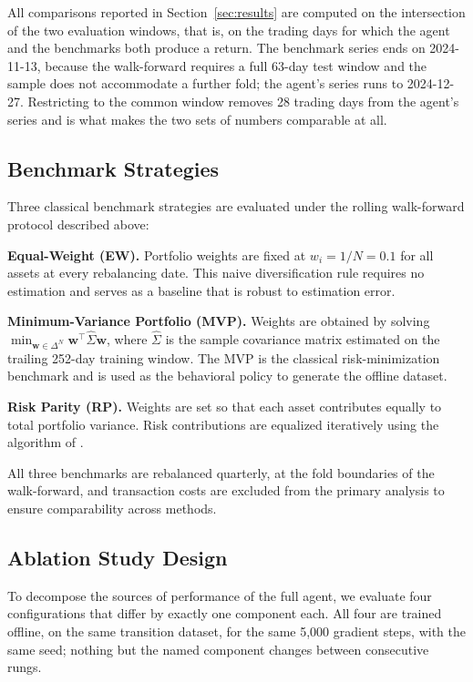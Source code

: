 All comparisons reported in Section~\ref{sec:results} are computed on the
intersection of the two evaluation windows, that is, on the trading days for
which the agent and the benchmarks both produce a return.
The benchmark series ends on 2024-11-13, because the walk-forward requires a full
63-day test window and the sample does not accommodate a further fold; the
agent's series runs to 2024-12-27.
Restricting to the common window removes 28 trading days from the agent's series
and is what makes the two sets of numbers comparable at all.

\subsection{Benchmark Strategies}
\label{subsec:benchmarks}

Three classical benchmark strategies are evaluated under the rolling
walk-forward protocol described above:

\textbf{Equal-Weight (EW).} Portfolio weights are fixed at $w_i = 1/N = 0.1$
for all assets at every rebalancing date.
This naive diversification rule \citep{DeMiguel2007} requires no estimation
and serves as a baseline that is robust to estimation error.

\textbf{Minimum-Variance Portfolio (MVP).} Weights are obtained by solving
$\min_{\mathbf{w} \in \Delta^N} \mathbf{w}^\top \hat{\Sigma} \mathbf{w}$,
where $\hat{\Sigma}$ is the sample covariance matrix estimated on the trailing
252-day training window.
The MVP is the classical risk-minimization benchmark and is used as the
behavioral policy to generate the offline dataset.

\textbf{Risk Parity (RP).} Weights are set so that each asset contributes equally
to total portfolio variance.
Risk contributions are equalized iteratively using the algorithm of
\citet{Maillard2010}.

All three benchmarks are rebalanced quarterly, at the fold boundaries of the
walk-forward, and transaction costs are excluded from the primary analysis
to ensure comparability across methods.

\subsection{Ablation Study Design}
\label{subsec:ablation}

To decompose the sources of performance of the full agent, we evaluate four
configurations that differ by exactly one component each.
All four are trained offline, on the same transition dataset, for the same
5{,}000 gradient steps, with the same seed; nothing but the named component
changes between consecutive rungs.

